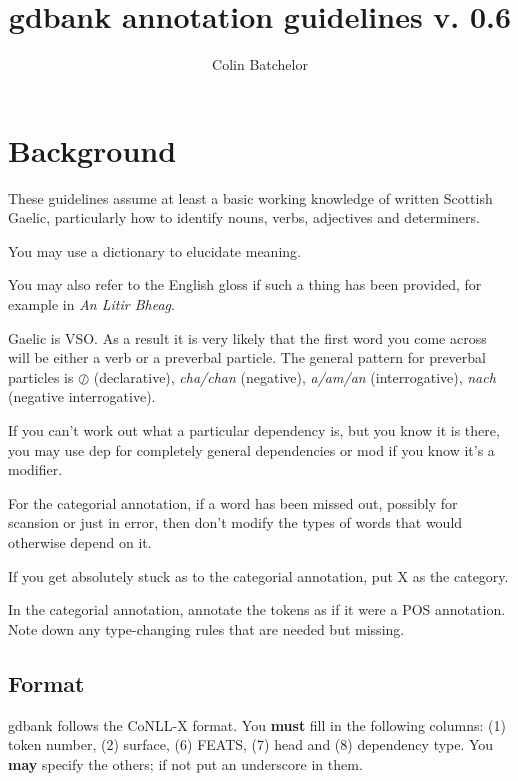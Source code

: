 \documentclass[a4paper]{article}
\begin{document}
\title{gdbank annotation guidelines v. 0.6}
\author{Colin Batchelor}
\maketitle

\section{Background}

These guidelines assume at least a basic working knowledge of written Scottish Gaelic, particularly how to identify nouns, verbs, adjectives and determiners.

 You may use a dictionary to elucidate meaning.

 You may also refer to the English gloss if such a thing has been provided, for example in {\it An Litir Bheag}.

 Gaelic is VSO. As a result it is very likely that the first word you come across will be either a verb or a preverbal particle.
The general pattern for preverbal particles is $\oslash$ (declarative), \textit{cha/chan} (negative), \textit{a/am/an} (interrogative), \textit{nach} (negative interrogative).

 If you can't work out what a particular dependency is, but you know it is there, you may use dep for completely general dependencies or mod if you know it's a modifier.

 For the categorial annotation, if a word has been missed out, possibly for scansion or just in error, then don't modify the types of words that would otherwise depend on it.

 If you get absolutely stuck as to the categorial annotation, put X as the category.

 In the categorial annotation, annotate the tokens as if it were a POS annotation. Note down any type-changing rules that are needed but missing.

\subsection{Format}

 gdbank follows the CoNLL-X format.
You \textbf{must} fill in the following columns: (1) token number, (2) surface, (6) FEATS, (7) head and (8) dependency type.
You \textbf{may} specify the others; if not put an underscore in them.
\end{document}
